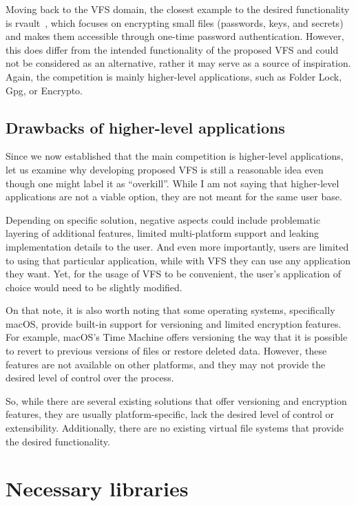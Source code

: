 Moving back to the VFS domain, the closest example to the desired functionality is rvault~\cite{rvault}, which focuses on encrypting small files (passwords, keys, and secrets) and makes them accessible through one-time password authentication.
However, this does differ from the intended functionality of the proposed VFS and could not be considered as an alternative, rather it may serve as a source of inspiration.
Again, the competition is mainly higher-level applications, such as Folder Lock, Gpg, or Encrypto.

\subsection{Drawbacks of higher-level applications}\label{subsec:drawbacks-of-higher-level-applications}

Since we now established that the main competition is higher-level applications, let us examine why developing proposed VFS is still a reasonable idea even though one might label it as ``overkill''.
While I am not saying that higher-level applications are not a viable option, they are not meant for the same user base.

Depending on specific solution, negative aspects could include problematic layering of additional features, limited multi-platform support and leaking implementation details to the user.
And even more importantly, users are limited to using that particular application, while with VFS they can use any application they want.
Yet, for the usage of VFS to be convenient, the user's application of choice would need to be slightly modified.

On that note, it is also worth noting that some operating systems, specifically macOS, provide built-in support for versioning and limited encryption features.
For example, macOS's Time Machine offers versioning the way that it is possible to revert to previous versions of files or restore deleted data.
However, these features are not available on other platforms, and they may not provide the desired level of control over the process.

So, while there are several existing solutions that offer versioning and encryption features, they are usually platform-specific, lack the desired level of control or extensibility.
Additionally, there are no existing virtual file systems that provide the desired functionality.


\section{Necessary libraries}\label{sec:libs}

